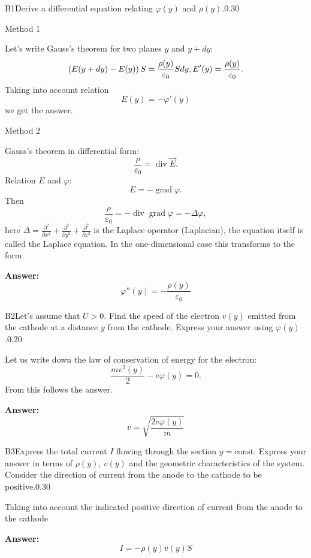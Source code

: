 \documentclass[11pt,a4paper]{article}
\begin{document}
\begin{solcard}{B1}{Derive a differential equation relating $\varphi(y)$ and $\rho(y)$.}{0.30}

Method 1


Let's write Gauss's theorem for two planes $y$ and $y + dy$: $$\left(E(y+dy) - E(y)\right)S = \frac{\rho(y)}{\varepsilon_0} S dy, \\ E'(y) = \frac{\rho(y)}{\varepsilon_0}.$$Taking into account relation $$E(y) = -\varphi'(y)$$ we get the answer.


Method 2


Gauss's theorem in differential form: $$\dfrac{\rho}{\varepsilon_0} = \operatorname{div} \vec{E}.$$Relation $E$ and $\varphi$: $$E =-\operatorname{grad} \varphi.$$Then $$\dfrac{\rho}{\varepsilon_0} = -\operatorname{div} \operatorname{grad} \varphi = -\Delta \varphi,$$here $\Delta = \frac{\partial^2}{\partial x^2} + \frac{\partial^2}{\partial y^2} + \frac{\partial^2}{\partial z^2}$ is the Laplace operator (Laplacian), the equation itself is called the Laplace equation. In the one-dimensional case this transforms to the form

\par\smallskip\noindent\textbf{Answer:} $$\varphi''(y) = -\frac{\rho(y)}{\varepsilon_0}$$
\end{solcard}

\begin{solcard}{B2}{Let's assume that $U > 0$. Find the speed of the electron $v(y)$ emitted from the cathode at a distance $y$ from the cathode. Express your answer using $\varphi(y)$.}{0.20}

Let us write down the law of conservation of energy for the electron: $$\frac{mv^2(y)}{2} - e\varphi(y) = 0.$$From this follows the answer.

\par\smallskip\noindent\textbf{Answer:} \[v=\sqrt{\dfrac{2e\varphi(y)}{m}}\]
\end{solcard}

\begin{solcard}{B3}{Express the total current $I$ flowing through the section $y = \mbox{const}$. Express your answer in terms of $\rho(y)$, $v(y)$ and the geometric characteristics of the system. Consider the direction of current from the anode to the cathode to be positive.}{0.30}

Taking into account the indicated positive direction of current from the anode to the cathode

\par\smallskip\noindent\textbf{Answer:} $$I = -\rho(y)v(y)S$$
\end{solcard}
\end{document}
